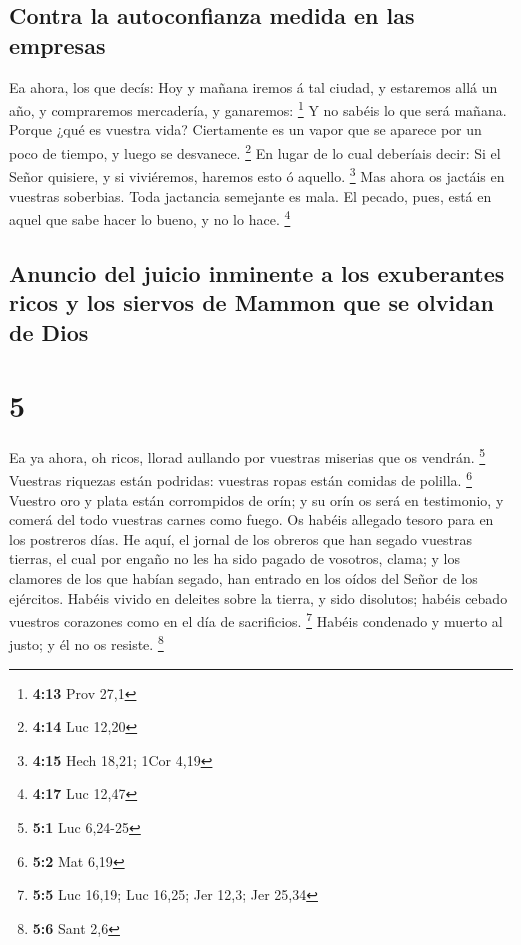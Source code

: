 \hypertarget{contra-la-autoconfianza-medida-en-las-empresas}{%
\subsection{Contra la autoconfianza medida en las
empresas}\label{contra-la-autoconfianza-medida-en-las-empresas}}

 Ea ahora, los que decís: Hoy y mañana iremos á tal
ciudad, y estaremos allá un año, y compraremos mercadería, y ganaremos:
\footnote{\textbf{4:13} Prov 27,1}  Y no sabéis lo que
será mañana. Porque ¿qué es vuestra vida? Ciertamente es un vapor que se
aparece por un poco de tiempo, y luego se desvanece. \footnote{\textbf{4:14}
  Luc 12,20}  En lugar de lo cual deberíais decir: Si el
Señor quisiere, y si viviéremos, haremos esto ó aquello. \footnote{\textbf{4:15}
  Hech 18,21; 1Cor 4,19}  Mas ahora os jactáis en
vuestras soberbias. Toda jactancia semejante es mala.  El
pecado, pues, está en aquel que sabe hacer lo bueno, y no lo hace.
\footnote{\textbf{4:17} Luc 12,47}

\hypertarget{anuncio-del-juicio-inminente-a-los-exuberantes-ricos-y-los-siervos-de-mammon-que-se-olvidan-de-dios}{%
\subsection{Anuncio del juicio inminente a los exuberantes ricos y los
siervos de Mammon que se olvidan de
Dios}\label{anuncio-del-juicio-inminente-a-los-exuberantes-ricos-y-los-siervos-de-mammon-que-se-olvidan-de-dios}}

\hypertarget{section-4}{%
\section{5}\label{section-4}}

 Ea ya ahora, oh ricos, llorad aullando por vuestras
miserias que os vendrán. \footnote{\textbf{5:1} Luc 6,24-25}
 Vuestras riquezas están podridas: vuestras ropas están
comidas de polilla. \footnote{\textbf{5:2} Mat 6,19} 
Vuestro oro y plata están corrompidos de orín; y su orín os será en
testimonio, y comerá del todo vuestras carnes como fuego. Os habéis
allegado tesoro para en los postreros días.  He aquí, el
jornal de los obreros que han segado vuestras tierras, el cual por
engaño no les ha sido pagado de vosotros, clama; y los clamores de los
que habían segado, han entrado en los oídos del Señor de los ejércitos.
 Habéis vivido en deleites sobre la tierra, y sido
disolutos; habéis cebado vuestros corazones como en el día de
sacrificios. \footnote{\textbf{5:5} Luc 16,19; Luc 16,25; Jer 12,3; Jer
  25,34}  Habéis condenado y muerto al justo; y él no os
resiste. \footnote{\textbf{5:6} Sant 2,6}

